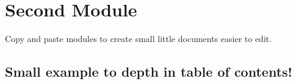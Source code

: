 \section{Second Module}

Copy and paste modules to create small little documents easier to edit.

\subsection{Small example to depth in table of contents!}







 





